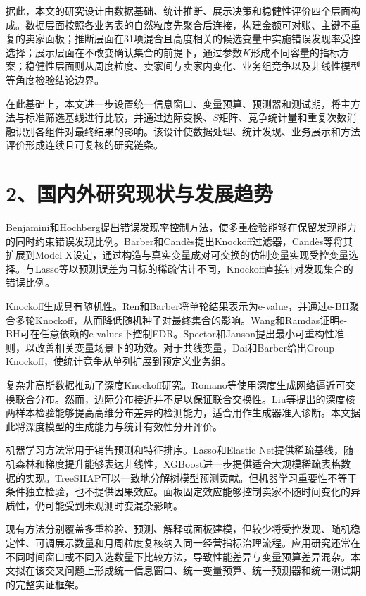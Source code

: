 \documentclass[UTF8,12pt,a4paper]{ctexart}
\begin{document}
据此，本文的研究设计由数据基础、统计推断、展示决策和稳健性评价四个层面构成。数据层面按照各业务表的自然粒度先聚合后连接，构建金额可对账、主键不重复的卖家面板；推断层面在31项混合且高度相关的候选变量中实施错误发现率受控选择；展示层面在不改变确认集合的前提下，通过参数$K$形成不同容量的指标方案；稳健性层面则从周度粒度、卖家间与卖家内变化、业务组竞争以及非线性模型等角度检验结论边界。

在此基础上，本文进一步设置统一信息窗口、变量预算、预测器和测试期，将主方法与标准筛选基线进行比较，并通过边际变换、$S$矩阵、竞争统计量和重复次数消融识别各组件对最终结果的影响。该设计使数据处理、统计发现、业务展示和方法评价形成连续且可复核的研究链条。

\newpage
\section*{2、国内外研究现状与发展趋势}

Benjamini和Hochberg提出错误发现率控制方法，使多重检验能够在保留发现能力的同时约束错误发现比例\cite{bh1995}。Barber和Candès提出Knockoff过滤器，Candès等将其扩展到Model-X设定，通过构造与真实变量成对可交换的仿制变量实现受控变量选择\cite{barber2015,candes2018}。与Lasso等以预测误差为目标的稀疏估计不同，Knockoff直接针对发现集合的错误比例。

Knockoff生成具有随机性。Ren和Barber将单轮结果表示为e-value，并通过e-BH聚合多轮Knockoff，从而降低随机种子对最终集合的影响\cite{ren2024}。Wang和Ramdas证明e-BH可在任意依赖的e-values下控制FDR\cite{wang2022}。Spector和Janson提出最小可重构性准则，以改善相关变量场景下的功效\cite{spector2022}。对于共线变量，Dai和Barber给出Group Knockoff，使统计竞争从单列扩展到预定义业务组\cite{dai2016}。

复杂非高斯数据推动了深度Knockoff研究。Romano等使用深度生成网络逼近可交换联合分布\cite{romano2020}。然而，边际分布接近并不足以保证联合交换性。Liu等提出的深度核两样本检验能够提高高维分布差异的检测能力\cite{liu2020}，适合用作生成器准入诊断。本文据此将深度模型的生成能力与统计有效性分开评价。

机器学习方法常用于销售预测和特征排序。Lasso和Elastic Net提供稀疏基线\cite{tibshirani1996,zou2005}，随机森林和梯度提升能够表达非线性\cite{breiman2001,friedman2001}，XGBoost进一步提供适合大规模稀疏表格数据的实现\cite{chen2016}。TreeSHAP可以一致地分解树模型预测贡献\cite{lundberg2017,lundberg2020}。但机器学习重要性不等于条件独立检验，也不提供因果效应。面板固定效应能够控制卖家不随时间变化的异质性\cite{wooldridge2010}，仍可能受到未观测时变混杂影响。

现有方法分别覆盖多重检验、预测、解释或面板建模，但较少将受控发现、随机稳定性、可调展示数量和月周粒度复核纳入同一经营指标治理流程。应用研究还常在不同时间窗口或不同入选数量下比较方法，导致性能差异与变量预算差异混杂。本文拟在该交叉问题上形成统一信息窗口、统一变量预算、统一预测器和统一测试期的完整实证框架。
\end{document}
